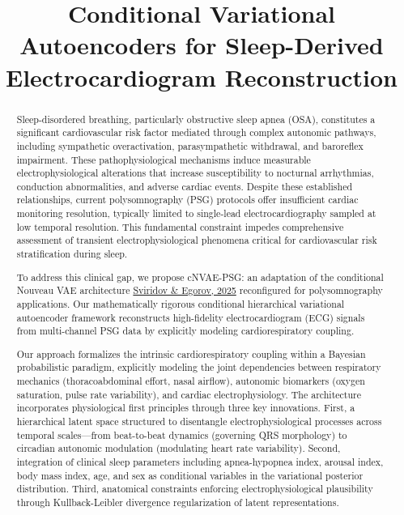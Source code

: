\documentclass[10pt, conference]{IEEEtran}
\title{Conditional Variational Autoencoders for Sleep-Derived Electrocardiogram Reconstruction}
\author{
\IEEEauthorblockN{Mithun Manivannan}
\IEEEauthorblockA{
Dr. Christopher Cheung\\
Schulich Heart Program, Sunnybrook Health Sciences \\
Email: \texttt{[mithun.manivannan@sri.utoronto.ca]}
}
}
\begin{document}
\maketitle

\begin{abstract}
Sleep-disordered breathing, particularly obstructive sleep apnea (OSA), constitutes a significant cardiovascular risk factor mediated through complex autonomic pathways, including sympathetic overactivation, parasympathetic withdrawal, and baroreflex impairment. These pathophysiological mechanisms induce measurable electrophysiological alterations that increase susceptibility to nocturnal arrhythmias, conduction abnormalities, and adverse cardiac events. Despite these established relationships, current polysomnography (PSG) protocols offer insufficient cardiac monitoring resolution, typically limited to single-lead electrocardiography sampled at low temporal resolution. This fundamental constraint impedes comprehensive assessment of transient electrophysiological phenomena critical for cardiovascular risk stratification during sleep.

To address this clinical gap, we propose cNVAE-PSG: an adaptation of the conditional Nouveau VAE architecture  \href{https://arxiv.org/abs/2503.13469}{Sviridov \& Egorov, 2025} reconfigured for polysomnography applications. Our mathematically rigorous conditional hierarchical variational autoencoder framework reconstructs high-fidelity electrocardiogram (ECG) signals from multi-channel PSG data by explicitly modeling cardiorespiratory coupling.

Our approach formalizes the intrinsic cardiorespiratory coupling within a Bayesian probabilistic paradigm, explicitly modeling the joint dependencies between respiratory mechanics (thoracoabdominal effort, nasal airflow), autonomic biomarkers (oxygen saturation, pulse rate variability), and cardiac electrophysiology. The architecture incorporates physiological first principles through three key innovations. First, a hierarchical latent space structured to disentangle electrophysiological processes across temporal scales—from beat-to-beat dynamics (governing QRS morphology) to circadian autonomic modulation (modulating heart rate variability).
Second, integration of clinical sleep parameters including apnea-hypopnea index, arousal index, body mass index, age, and sex as conditional variables in the variational posterior distribution. Third, anatomical constraints enforcing electrophysiological plausibility through Kullback-Leibler divergence regularization of latent representations.



\end{abstract}
\end{document}
